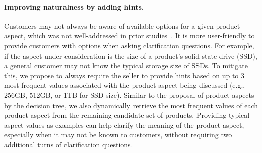 \paragraph{Improving naturalness by adding hints.}
\label{sec:improving_naturalness}
Customers may not always be aware of available options for a given product aspect, which was not well-addressed in prior studies~\cite{zhang2018towards,bi2019conversational,zou2022learning}. 
It is more user-friendly to provide customers with options when asking clarification questions. For example, if the aspect under consideration is the size of a product's solid-state drive (SSD), a general customer may not know the typical storage size of SSDs. %
To mitigate this, we propose to always require the seller to provide hints based on up to 3 most frequent values associated with the product aspect being discussed (e.g., 256GB, 512GB, or 1TB for SSD size). 
Similar to the proposal of product aspects by the decision tree, we also dynamically retrieve the most frequent values of each product aspect from the remaining candidate set of products. Providing typical aspect values as examples can help clarify the meaning of the product aspect, especially when it may not be known to customers, without requiring two additional turns of clarification questions.

\vspace{-0.5em}
